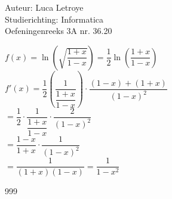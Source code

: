 \documentclass[a4paper]{article}
\begin{document}
  
\noindent \large Auteur: Luca Letroye        \\
\noindent \large Studierichting: Informatica \\
\noindent \large Oefeningenreeks 3A nr. 36.20 \\

\medskip

\normalsize

$f(x) = \ln \left(\sqrt{\dfrac{1+x}{1-x}} \right) = \dfrac{1}{2}\ln\left(\dfrac{1+x}{1-x}\right)$\\

$f'(x) = \dfrac{1}{2} \left(\dfrac{1}{\dfrac{1+x}{1-x}} \right)\cdot \dfrac{(1-x)+(1+x)}{(1-x)^2}$\\

$= \dfrac{1}{2}\cdot \dfrac{1}{\dfrac{1+x}{1-x}}\cdot \dfrac{2}{(1-x)^2}$\\

$=  \dfrac{1-x}{1+x}\cdot \dfrac{1}{(1-x)^2}$\\

$= \dfrac{1}{(1+x)(1-x)} = \dfrac{1}{1-x^2}$\\






\begin{thebibliography}{999}
\end{thebibliography}
\end{document}
